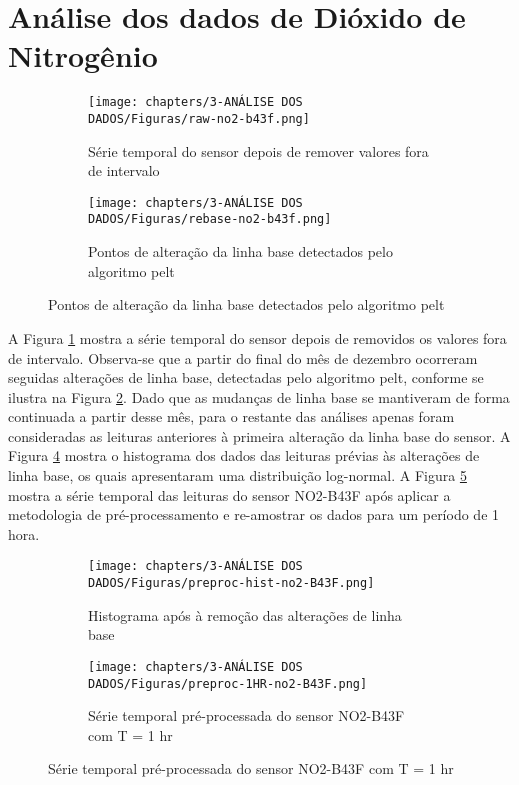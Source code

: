 \section{Análise dos dados de Dióxido de Nitrogênio}

\begin{figure}[h]
    \centering
    \caption{Série temporal do sensor NO2-B43F}
    \begin{subfigure}{0.495\textwidth}
        \texttt{[image: chapters/3-ANÁLISE DOS DADOS/Figuras/raw-no2-b43f.png]}
        \caption{Série temporal do sensor depois de remover valores fora de intervalo}
        \label{fig:data-no2-raw}
    \end{subfigure}
    \hfill
    \begin{subfigure}{0.495\textwidth}
        \texttt{[image: chapters/3-ANÁLISE DOS DADOS/Figuras/rebase-no2-b43f.png]}
        \caption{Pontos de alteração da linha base detectados pelo algoritmo \acrshort{pelt}}
        \label{fig:data-rebase-no2}
    \end{subfigure}
    \hfill
    \label{fig:data-no2-raw-and-pelt}
\end{figure}

A Figura \ref{fig:data-no2-raw} mostra a série temporal do sensor depois de removidos os valores fora de intervalo. Observa-se que a partir do final do mês de dezembro ocorreram seguidas alterações de linha base, detectadas pelo algoritmo \acrshort{pelt}, conforme se ilustra na Figura \ref{fig:data-rebase-no2}. Dado que as mudanças de linha base se mantiveram de forma continuada a partir desse mês, para o restante das análises apenas foram consideradas as leituras anteriores à primeira alteração da linha base do sensor. A Figura \ref{fig:data-no2-preproc-hist} mostra o histograma dos dados das leituras prévias às alterações de linha base, os quais apresentaram uma distribuição log-normal. A Figura \ref{fig:data-co-preproc-1HR} mostra a série temporal das leituras do sensor NO2-B43F após aplicar a metodologia de pré-processamento e re-amostrar os dados para um período de 1 hora.

\begin{figure}[h]
    \centering
    \caption{Histograma das leituras do sensor NO2-B43F}
    \begin{subfigure}{0.45\textwidth}
        \texttt{[image: chapters/3-ANÁLISE DOS DADOS/Figuras/preproc-hist-no2-B43F.png]}
        \caption{Histograma após à remoção das alterações de linha base}
        \label{fig:data-no2-preproc-hist}
    \end{subfigure}
    \hfill
    \begin{subfigure}{0.495\textwidth}
        \texttt{[image: chapters/3-ANÁLISE DOS DADOS/Figuras/preproc-1HR-no2-B43F.png]}
        \caption{Série temporal pré-processada do sensor NO2-B43F com T = 1 hr}
        \label{fig:data-co-preproc-1HR}
    \end{subfigure}
    \label{fig:data-no2-preproc}
\end{figure}


